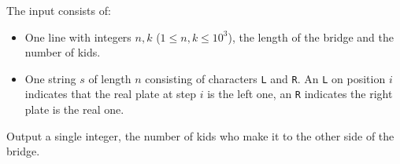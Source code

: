 \begin{Input}
	The input consists of:
  \begin{itemize}
    \item One line with integers $n, k$ ($1 \leq n,k \leq 10^3$), the
	length of the bridge and the number of kids.
    \item One string $s$ of length $n$ consisting of characters \texttt{L} and \texttt{R}. An \texttt{L} on position $i$ indicates that the real plate at step $i$ is the left one, an \texttt{R} indicates the right plate is the real one.
  \end{itemize}
\end{Input}

\begin{Output}
        Output a single integer, the number of kids who make it to the
        other side of the bridge.
\end{Output}

